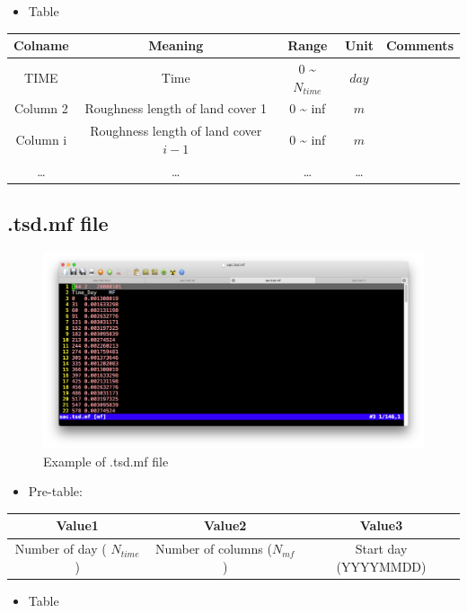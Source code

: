 \documentclass[]{scrbook}
\providecommand{\tightlist}{%
  \setlength{\itemsep}{0pt}\setlength{\parskip}{0pt}}
\begin{document}
\begin{itemize}
\tightlist
\item
  Table
\end{itemize}

\begin{longtable}[]{@{}ccccc@{}}
\toprule
Colname & Meaning & Range & Unit & Comments\tabularnewline
\midrule
\endhead
TIME & Time & 0 \textasciitilde{} \(N_{time}\) & \(day\)
&\tabularnewline
Column 2 & Roughness length of land cover 1 & 0 \textasciitilde{} inf &
\(m\) &\tabularnewline
Column i & Roughness length of land cover \(i-1\) & 0 \textasciitilde{}
inf & \(m\) &\tabularnewline
\ldots{} & \ldots{} & \ldots{} & \ldots{} &\tabularnewline
\bottomrule
\end{longtable}

\subsection{.tsd.mf file}\label{tsd.mf-file}

\begin{figure}
\centering
\includegraphics{Fig/IO/tsd.mf.png}
\caption{Example of .tsd.mf file}
\end{figure}

\begin{itemize}
\tightlist
\item
  Pre-table:
\end{itemize}

\begin{longtable}[]{@{}ccc@{}}
\toprule
Value1 & Value2 & Value3\tabularnewline
\midrule
\endhead
Number of day ( \(N_{time}\)) & Number of columns (\(N_{mf}\)) & Start
day (YYYYMMDD)\tabularnewline
\bottomrule
\end{longtable}

\begin{itemize}
\tightlist
\item
  Table
\end{itemize}
\end{document}
